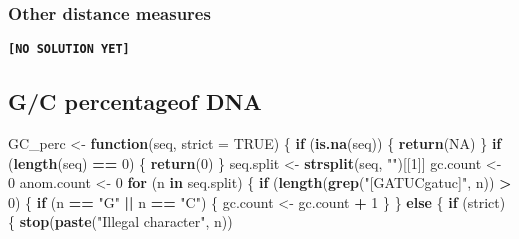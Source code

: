 \documentclass[]{book}
\newenvironment{Shaded}{\begin{snugshade}}{\end{snugshade}}
\newcommand{\ControlFlowTok}[1]{\textcolor[rgb]{0.13,0.29,0.53}{\textbf{#1}}}
\newcommand{\DataTypeTok}[1]{\textcolor[rgb]{0.13,0.29,0.53}{#1}}
\newcommand{\DecValTok}[1]{\textcolor[rgb]{0.00,0.00,0.81}{#1}}
\newcommand{\KeywordTok}[1]{\textcolor[rgb]{0.13,0.29,0.53}{\textbf{#1}}}
\newcommand{\NormalTok}[1]{#1}
\newcommand{\OperatorTok}[1]{\textcolor[rgb]{0.81,0.36,0.00}{\textbf{#1}}}
\newcommand{\OtherTok}[1]{\textcolor[rgb]{0.56,0.35,0.01}{#1}}
\newcommand{\StringTok}[1]{\textcolor[rgb]{0.31,0.60,0.02}{#1}}
\begin{document}
\hypertarget{other-distance-measures-1}{%
\subsubsection*{Other distance measures}\label{other-distance-measures-1}}

\textbf{\texttt{{[}NO\ SOLUTION\ YET{]}}}

\hypertarget{gc-percentageof-dna-1}{%
\subsection{G/C percentageof DNA}\label{gc-percentageof-dna-1}}

\begin{Shaded}
\begin{Highlighting}[]
\NormalTok{GC_perc <-}\StringTok{ }\ControlFlowTok{function}\NormalTok{(seq, }\DataTypeTok{strict =} \OtherTok{TRUE}\NormalTok{) \{}
        \ControlFlowTok{if}\NormalTok{ (}\KeywordTok{is.na}\NormalTok{(seq)) \{}
                \KeywordTok{return}\NormalTok{(}\OtherTok{NA}\NormalTok{)}
\NormalTok{        \}}
        \ControlFlowTok{if}\NormalTok{ (}\KeywordTok{length}\NormalTok{(seq) }\OperatorTok{==}\StringTok{ }\DecValTok{0}\NormalTok{) \{}
                \KeywordTok{return}\NormalTok{(}\DecValTok{0}\NormalTok{)}
\NormalTok{        \}}
\NormalTok{        seq.split <-}\StringTok{ }\KeywordTok{strsplit}\NormalTok{(seq, }\StringTok{""}\NormalTok{)[[}\DecValTok{1}\NormalTok{]]}
\NormalTok{        gc.count <-}\StringTok{ }\DecValTok{0}
\NormalTok{        anom.count <-}\StringTok{ }\DecValTok{0}
        \ControlFlowTok{for}\NormalTok{ (n }\ControlFlowTok{in}\NormalTok{ seq.split) \{}
                \ControlFlowTok{if}\NormalTok{ (}\KeywordTok{length}\NormalTok{(}\KeywordTok{grep}\NormalTok{(}\StringTok{"[GATUCgatuc]"}\NormalTok{, n)) }\OperatorTok{>}\StringTok{ }\DecValTok{0}\NormalTok{) \{}
                        \ControlFlowTok{if}\NormalTok{ (n }\OperatorTok{==}\StringTok{ "G"} \OperatorTok{||}\StringTok{ }\NormalTok{n }\OperatorTok{==}\StringTok{ "C"}\NormalTok{) \{}
\NormalTok{                                gc.count <-}\StringTok{ }\NormalTok{gc.count }\OperatorTok{+}\StringTok{ }\DecValTok{1}
\NormalTok{                        \}}
\NormalTok{                \} }\ControlFlowTok{else}\NormalTok{ \{}
                        \ControlFlowTok{if}\NormalTok{ (strict) \{}
                                \KeywordTok{stop}\NormalTok{(}\KeywordTok{paste}\NormalTok{(}\StringTok{"Illegal character"}\NormalTok{, n))}

\end{Highlighting}
\end{Shaded}
\end{document}
